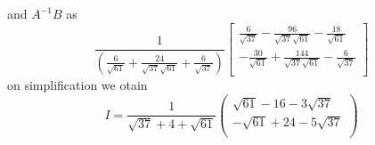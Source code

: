 \documentclass[11pt]{article}
\begin{document}
\begin{flushleft}
\[\]
and $A^{-1}B$ as
\[
\frac{1}{(\frac{6}{\sqrt{61}}+\frac{24}{\sqrt{37}\sqrt{61}}+\frac{6}{\sqrt{37}})}
\begin{bmatrix}
\frac{6}{\sqrt{37}}-\frac{96}{\sqrt{37}\sqrt{61}}-\frac{18}{\sqrt{61}}\\
-\frac{30}{\sqrt{61}}+\frac{144}{\sqrt{37}\sqrt{61}}-\frac{6}{\sqrt{37}}\\
\end{bmatrix}
\]
on simplification we otain
\[
I=\frac{1}{\sqrt{37}+4+\sqrt{61}}
\begin{pmatrix}
\sqrt{61}-16-3\sqrt{37}\\
-\sqrt{61}+24-5\sqrt{37}\\
\end{pmatrix}
\]
\end{flushleft}
\end{document}
